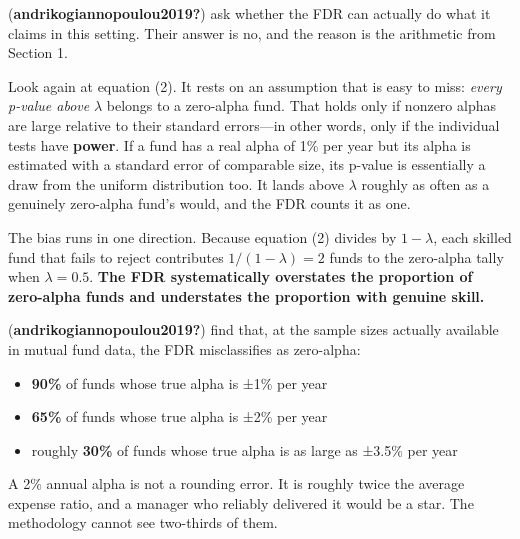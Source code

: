 \documentclass[
  letterpaper,
  DIV=11,
  numbers=noendperiod]{scrartcl}
\providecommand{\tightlist}{%
  \setlength{\itemsep}{0pt}\setlength{\parskip}{0pt}}
\begin{document}
(\textbf{andrikogiannopoulou2019?}) ask whether the FDR can actually do
what it claims in this setting. Their answer is no, and the reason is
the arithmetic from Section 1.

Look again at equation (2). It rests on an assumption that is easy to
miss: \emph{every p-value above} \(\lambda\) belongs to a zero-alpha
fund. That holds only if nonzero alphas are large relative to their
standard errors---in other words, only if the individual tests have
\textbf{power}. If a fund has a real alpha of 1\% per year but its alpha
is estimated with a standard error of comparable size, its p-value is
essentially a draw from the uniform distribution too. It lands above
\(\lambda\) roughly as often as a genuinely zero-alpha fund's would, and
the FDR counts it as one.

The bias runs in one direction. Because equation (2) divides by
\(1-\lambda\), each skilled fund that fails to reject contributes
\(1/(1-\lambda) = 2\) funds to the zero-alpha tally when
\(\lambda = 0.5\). \textbf{The FDR systematically overstates the
proportion of zero-alpha funds and understates the proportion with
genuine skill.}

\begin{tcolorbox}[enhanced jigsaw, arc=.35mm, bottomrule=.15mm, bottomtitle=1mm, breakable, colback=white, colbacktitle=quarto-callout-important-color!10!white, colframe=quarto-callout-important-color-frame, coltitle=black, left=2mm, leftrule=.75mm, opacityback=0, opacitybacktitle=0.6, rightrule=.15mm, title=\textcolor{quarto-callout-important-color}{\faExclamation}\hspace{0.5em}{The headline result}, titlerule=0mm, toprule=.15mm, toptitle=1mm]

(\textbf{andrikogiannopoulou2019?}) find that, at the sample sizes
actually available in mutual fund data, the FDR misclassifies as
zero-alpha:

\begin{itemize}
\tightlist
\item
  \textbf{90\%} of funds whose true alpha is ±1\% per year
\item
  \textbf{65\%} of funds whose true alpha is ±2\% per year
\item
  roughly \textbf{30\%} of funds whose true alpha is as large as ±3.5\%
  per year
\end{itemize}

A 2\% annual alpha is not a rounding error. It is roughly twice the
average expense ratio, and a manager who reliably delivered it would be
a star. The methodology cannot see two-thirds of them.

\end{tcolorbox}
\end{document}
